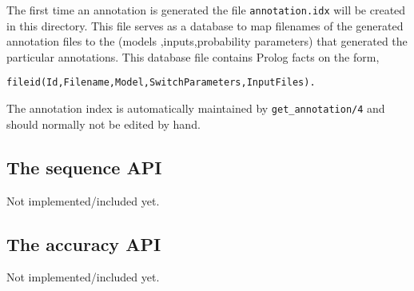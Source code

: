 \documentclass{article}
\begin{document}
The first time an annotation is generated the file
\texttt{annotation.idx} will be created in this directory. This file
serves as a database to map filenames of the generated annotation
files to the (models ,inputs,probability parameters) that generated
the particular annotations. This database file contains Prolog facts 
on the form,
\begin{verbatim}
fileid(Id,Filename,Model,SwitchParameters,InputFiles).
\end{verbatim}

The annotation index is automatically maintained by
\texttt{get\_annotation/4} and should normally not be edited by hand.

\subsection{The sequence API}

Not implemented/included yet.

\subsection{The accuracy API}

Not implemented/included yet.
\end{document}
